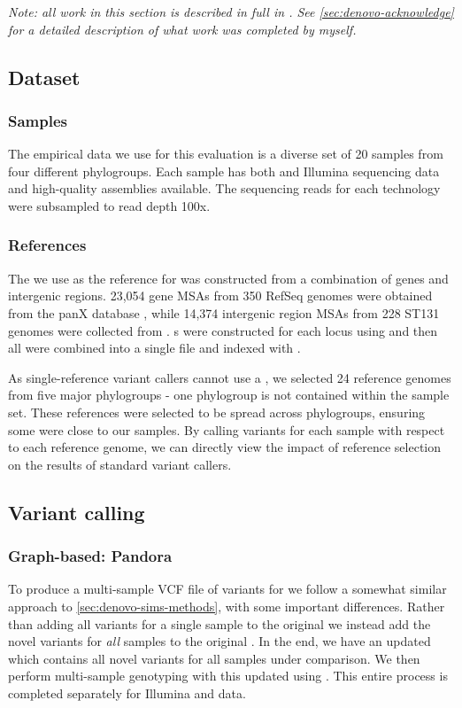 \textit{Note: all work in this section is described in full in \cite{pandora}. See \autoref{sec:denovo-acknowledge} for a detailed description of what work was completed by myself.}

\subsection{Dataset}
\label{sec:denovo-empirical-data}

\subsubsection{Samples}
The empirical data we use for this evaluation is a diverse set of 20 \ecoli{} samples from four different phylogroups. Each sample has both \ont{} and Illumina sequencing data and high-quality assemblies available. The sequencing reads for each technology were subsampled to read depth 100x.

\subsubsection{References}
The \panrg{} we use as the reference for \pandora{} was constructed from a combination of \ecoli{} genes and intergenic regions. 23,054 gene MSAs from 350 RefSeq genomes were obtained from the panX database \cite{panx}, while 14,374 intergenic region MSAs from 228 ST131 genomes were collected from \cite{thorpe2018}. \prg{}s were constructed for each locus using \makeprg{} and then all were combined into a single \panrg{} file and indexed with \pandora{}.

As single-reference variant callers cannot use a \panrg{}, we selected 24 reference genomes from five major phylogroups - one phylogroup is not contained within the sample set. These references were selected to be spread across phylogroups, ensuring some were close to our samples. By calling variants for each sample with respect to each reference genome, we can directly view the impact of reference selection on the results of standard variant callers.

\subsection{Variant calling}

\subsubsection{Graph-based: Pandora}
To produce a multi-sample VCF file of variants for \pandora{} we follow a somewhat similar approach to \autoref{sec:denovo-sims-methods}, with some important differences. Rather than adding all \denovo{} variants for a single sample to the original \panrg{} we instead add the novel variants for \emph{all} samples to the original \panrg{}. In the end, we have an updated \panrg{} which contains all novel variants for all samples under comparison. We then perform multi-sample genotyping with this updated \panrg{} using \compare{}. This entire process is completed separately for Illumina and \ont{} data.

